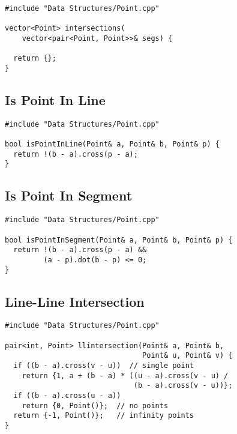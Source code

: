 \documentclass[twoside]{article}
\begin{document}
\begin{multicols*}{2}
\begin{verbatim}
#include "Data Structures/Point.cpp"

vector<Point> intersections(
    vector<pair<Point, Point>>& segs) {
      
  return {};
}
\end{verbatim}

\subsectionfont{\large\bfseries\sffamily\underline}
\subsection*{Is Point In Line}
\begin{verbatim}
#include "Data Structures/Point.cpp"

bool isPointInLine(Point& a, Point& b, Point& p) {
  return !(b - a).cross(p - a);
}
\end{verbatim}

\subsectionfont{\large\bfseries\sffamily\underline}
\subsection*{Is Point In Segment}
\begin{verbatim}
#include "Data Structures/Point.cpp"

bool isPointInSegment(Point& a, Point& b, Point& p) {
  return !(b - a).cross(p - a) &&
         (a - p).dot(b - p) <= 0;
}
\end{verbatim}

\subsectionfont{\large\bfseries\sffamily\underline}
\subsection*{Line-Line Intersection}
\begin{verbatim}
#include "Data Structures/Point.cpp"

pair<int, Point> llintersection(Point& a, Point& b,
                                Point& u, Point& v) {
  if ((b - a).cross(v - u))  // single point
    return {1, a + (b - a) * ((u - a).cross(v - u) /
                              (b - a).cross(v - u))};
  if ((b - a).cross(u - a))
    return {0, Point()};  // no points
  return {-1, Point()};   // infinity points
}
\end{verbatim}

\subsectionfont{\large\bfseries\sffamily\underline}

\end{multicols*}
\end{document}
